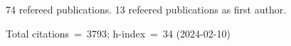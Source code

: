 74 refereed publications. 13 refeered publications as first author.

Total citations~=~3793; h-index~=~34 (2024-02-10)